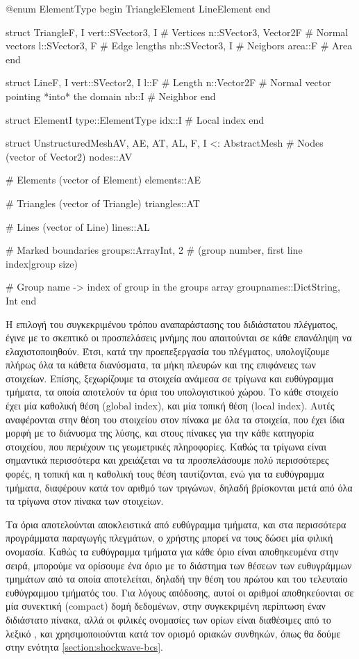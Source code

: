 {\large
\begin{jllisting}[language=julia,style=jlcodestyle]
@enum ElementType begin
    TriangleElement
    LineElement
end

struct Triangle{F, I}
    vert::SVector{3, I} # Vertices
    n::SVector{3, Vector2{F}} # Normal vectors
    l::SVector{3, F} # Edge lengths
    nb::SVector{3, I} # Neigbors
    area::F # Area
end

struct Line{F, I}
    vert::SVector{2, I}
    l::F # Length
    n::Vector2{F} # Normal vector pointing *into* the domain
    nb::I # Neighbor
end

struct Element{I}
    type::ElementType
    idx::I # Local index
end

struct UnstructuredMesh{AV, AE, AT, AL, F, I} <: AbstractMesh
    # Nodes (vector of Vector2)
    nodes::AV

    # Elements (vector of Element)
    elements::AE

    # Triangles (vector of Triangle)
    triangles::AT

    # Lines (vector of Line)
    lines::AL

    # Marked boundaries
    groups::Array{Int, 2} # (group number, first line index|group size)

    # Group name -> index of group in the groups array
    groupnames::Dict{String, Int}
end
\end{jllisting}
}

Η επιλογή του συγκεκριμένου τρόπου αναπαράστασης του διδιάστατου πλέγματος, έγινε με το σκεπτικό οι προσπελάσεις μνήμης που απαιτούνται σε κάθε επανάληψη να ελαχιστοποιηθούν.
Έτσι, κατά την προεπεξεργασία του πλέγματος, υπολογίζουμε πλήρως όλα τα κάθετα διανύσματα, τα μήκη πλευρών και της επιφάνειες των στοιχείων.
Επίσης, ξεχωρίζουμε τα στοιχεία ανάμεσα σε τρίγωνα και ευθύγραμμα τμήματα, τα οποία αποτελούν τα όρια του υπολογιστικού χώρου.
Το κάθε στοιχείο έχει μία καθολική θέση (global index), και μία τοπική θέση (local index).
Αυτές αναφέρονται στην θέση του στοιχείου στον πίνακα με όλα τα στοιχεία, που έχει ίδια μορφή με το διάνυσμα της λύσης, και στους πίνακες για την κάθε κατηγορία στοιχείου, που περιέχουν τις γεωμετρικές πληροφορίες.
Καθώς τα τρίγωνα είναι σημαντικά περισσότερα και χρειάζεται να τα προσπελάσουμε πολύ περισσότερες φορές, η τοπική και η καθολική τους θέση ταυτίζονται, ενώ για τα ευθύγραμμα τμήματα, διαφέρουν κατά τον αριθμό των τριγώνων, δηλαδή βρίσκονται μετά από όλα τα τρίγωνα στον πίνακα των στοιχείων.

Τα όρια αποτελούνται αποκλειστικά από ευθύγραμμα τμήματα, και στα περισσότερα προγράμματα παραγωγής πλεγμάτων, ο χρήστης μπορεί να τους δώσει μία φιλική ονομασία.
Καθώς τα ευθύγραμμα τμήματα για κάθε όριο είναι αποθηκευμένα στην σειρά, μπορούμε να ορίσουμε ένα όριο με το διάστημα των θέσεων των ευθυγράμμων τμημάτων από τα οποία αποτελείται, δηλαδή την θέση του πρώτου και του τελευταίο ευθύγραμμου τμήματός του.
Για λόγους απόδοσης, αυτοί οι αριθμοί αποθηκεύονται σε μία συνεκτική (compact) δομή δεδομένων, στην συγκεκριμένη περίπτωση έναν διδιάστατο πίνακα, αλλά οι φιλικές ονομασίες των ορίων είναι διαθέσιμες από το λεξικό , και χρησιμοποιούνται κατά τον ορισμό οριακών συνθηκών, όπως θα δούμε στην ενότητα \ref{section:shockwave-bcs}.

